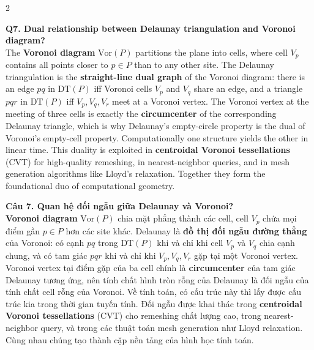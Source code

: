 \begin{paracol}{2}
\switchcolumn*

\textbf{Q7. Dual relationship between Delaunay triangulation and Voronoi diagram?}\\
The \textbf{Voronoi diagram} $\mathrm{Vor}(P)$ partitions the plane into cells, where cell $V_p$ contains all points closer to $p \in P$ than to any other site. The Delaunay triangulation is the \textbf{straight-line dual graph} of the Voronoi diagram: there is an edge $pq$ in $\mathrm{DT}(P)$ iff Voronoi cells $V_p$ and $V_q$ share an edge, and a triangle $pqr$ in $\mathrm{DT}(P)$ iff $V_p,V_q,V_r$ meet at a Voronoi vertex. The Voronoi vertex at the meeting of three cells is exactly the \textbf{circumcenter} of the corresponding Delaunay triangle, which is why Delaunay's empty-circle property is the dual of Voronoi's empty-cell property. Computationally one structure yields the other in linear time. This duality is exploited in \textbf{centroidal Voronoi tessellations} (CVT) for high-quality remeshing, in nearest-neighbor queries, and in mesh generation algorithms like Lloyd's relaxation. Together they form the foundational duo of computational geometry.

\switchcolumn

\textbf{Câu 7. Quan hệ đối ngẫu giữa Delaunay và Voronoi?}\\
\textbf{Voronoi diagram} $\mathrm{Vor}(P)$ chia mặt phẳng thành các cell, cell $V_p$ chứa mọi điểm gần $p \in P$ hơn các site khác. Delaunay là \textbf{đồ thị đối ngẫu đường thẳng} của Voronoi: có cạnh $pq$ trong $\mathrm{DT}(P)$ khi và chỉ khi cell $V_p$ và $V_q$ chia cạnh chung, và có tam giác $pqr$ khi và chỉ khi $V_p,V_q,V_r$ gặp tại một Voronoi vertex. Voronoi vertex tại điểm gặp của ba cell chính là \textbf{circumcenter} của tam giác Delaunay tương ứng, nên tính chất hình tròn rỗng của Delaunay là đối ngẫu của tính chất cell rỗng của Voronoi. Về tính toán, có cấu trúc này thì lấy được cấu trúc kia trong thời gian tuyến tính. Đối ngẫu được khai thác trong \textbf{centroidal Voronoi tessellations} (CVT) cho remeshing chất lượng cao, trong nearest-neighbor query, và trong các thuật toán mesh generation như Lloyd relaxation. Cùng nhau chúng tạo thành cặp nền tảng của hình học tính toán.

\switchcolumn*


\end{paracol}
